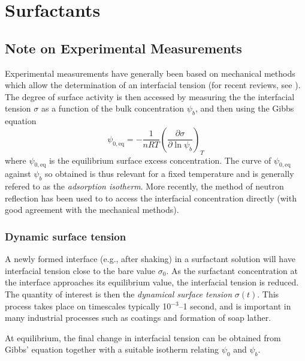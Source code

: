 %
%
%

\section{Surfactants}

\subsection{Note on Experimental Measurements}

Experimental measurements have generally been based on mechanical
methods which allow the determination of an interfacial tension
(for recent reviews, see \cite{chang,eastoe}). The degree of surface
activity is then accessed by measuring the the interfacial tension
$\sigma$ as a function of the bulk concentration $\psi_b$, and then
using the Gibbs equation
\begin{equation}
\psi_{0,\mathrm{eq}} = -\frac{1}{nRT}
\left( \frac{\partial \sigma}{\partial \ln \psi_b} \right)_T
\end{equation}
where $\psi_{0,\mathrm{eq}}$ is the equilibrium surface excess
concentration. The curve of $\psi_{0,\mathrm{eq}}$ against $\psi_b$
so obtained is thus relevant for a fixed temperature and is generally
refered to as the \textit{adsorption isotherm}. More recently, the
method of neutron reflection has been used to to access the interfacial
concentration directly (with good agreement with the mechanical
methods).

\subsubsection{Dynamic surface tension}

A newly formed interface (e.g., after shaking) in a surfactant
solution will have interfacial tension close to the bare value
$\sigma_0$. As the surfactant concentration at the interface
approaches its equilibrium value, the interfacial tension is
reduced. The quantity of interest is then the \textit{dynamical
surface tension} $\sigma(t)$. This process takes place on
timescales typically 10$^{-3}$--1 second, and is important in
many industrial processes such as coatings and formation of
soap lather.

At equilibrium, the final change in interfacial tension can
be obtained from Gibbs' equation together with a suitable
isotherm relating $\psi_0$ and $\psi_b$. 

